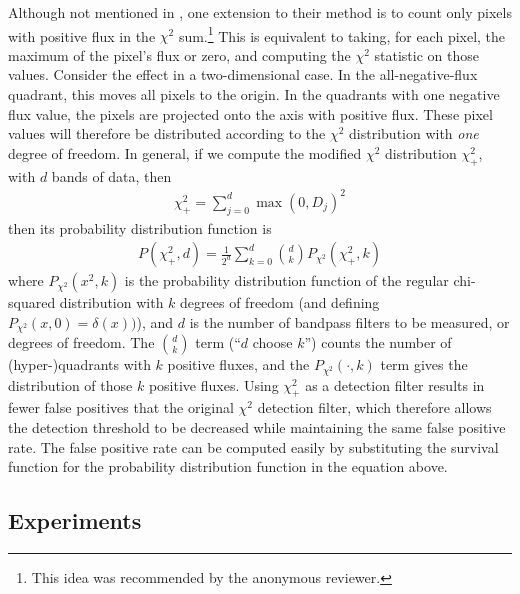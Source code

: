 \documentclass[11pt,letterpaper,linenumbers]{aastex63}
\newcommand{\chipos}{\chi_+}
\begin{document}
Although not mentioned in \cite{szalay1999}, one extension to their
method is to count only pixels with positive flux in the $\chi^2$
sum.\footnote{This idea was recommended by the anonymous reviewer.}
This is equivalent to taking, for each pixel, the maximum of the
pixel's flux or zero, and computing the $\chi^2$ statistic on those
values.  Consider the effect in a two-dimensional case.  In the
all-negative-flux quadrant, this moves all pixels to the origin.  In
the quadrants with one negative flux value, the pixels are projected
onto the axis with positive flux.  These pixel values will therefore
be distributed according to the $\chi^2$ distribution with \emph{one}
degree of freedom.  In general, if we compute the modified $\chi^2$
distribution $\chipos^2$, with $d$ bands of data, then
\begin{eqnarray}
  \chipos^2 = \sum_{j=0}^d \max(0, D_j)^2
  \label{eqn:chipos}
\end{eqnarray}
then its probability distribution function is
\begin{eqnarray}
P(\chipos^2, d) = \frac{1}{2^d} \sum_{k=0}^d \binom{d}{k} P_{\chi^2}(\chipos^2, k)
\end{eqnarray}
where $P_{\chi^2}(x^2, k)$ is the probability distribution function of
the regular chi-squared distribution with $k$ degrees of freedom (and
defining $P_{\chi^2}(x, 0) = \delta(x))$), and $d$ is the number of
bandpass filters to be measured, or degrees of freedom.  The
$\binom{d}{k}$ term (``$d$ choose $k$'') counts the number of (hyper-)quadrants with $k$
positive fluxes, and the $P_{\chi^2}(\cdot, k)$ term gives the distribution of those $k$ positive fluxes.  Using
$\chipos^2$ as a detection filter results in fewer false positives
that the original $\chi^2$ detection filter, which therefore allows
the detection threshold to be decreased while maintaining the same
false positive rate.  The false positive rate can be computed easily
by substituting the survival function for the probability distribution
function in the equation above.

\subsection{Experiments}
\end{document}
